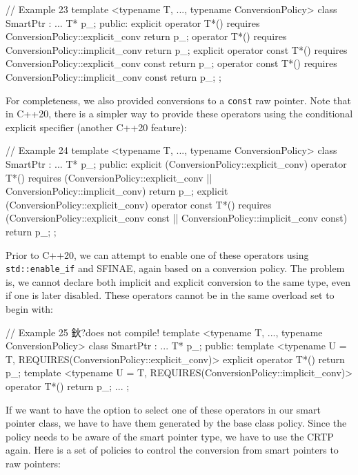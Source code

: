 \begin{code}
// Example 23
template <typename T, ..., typename ConversionPolicy>
class SmartPtr : ... {
  T* p_;
  public:
  explicit operator T*()
    requires ConversionPolicy::explicit_conv
    { return p_; }
  operator T*()
    requires ConversionPolicy::implicit_conv
    { return p_; }
  explicit operator const T*()
    requires ConversionPolicy::explicit_conv const
    { return p_; }
  operator const T*()
    requires ConversionPolicy::implicit_conv const
    { return p_; }
};
\end{code}

For completeness, we also provided conversions to a \texttt{const} raw pointer. Note that in C++20, there is a simpler way to provide these operators using the conditional explicit specifier (another C++20 feature):

\begin{code}
// Example 24
template <typename T, ..., typename ConversionPolicy>
class SmartPtr : ... {
  T* p_;
  public:
  explicit (ConversionPolicy::explicit_conv)
  operator T*()
    requires (ConversionPolicy::explicit_conv ||
              ConversionPolicy::implicit_conv)
    { return p_; }
  explicit (ConversionPolicy::explicit_conv)
  operator const T*()
    requires (ConversionPolicy::explicit_conv const ||
              ConversionPolicy::implicit_conv const)
    { return p_; }
};
\end{code}

Prior to C++20, we can attempt to enable one of these operators using \texttt{std::enable\_if} and SFINAE, again based on a conversion policy. The problem is, we cannot declare both implicit and explicit conversion to the same type, even if one is later disabled. These operators cannot be in the same overload set to begin with:

\begin{code}
// Example 25 鈥?does not compile!
template <typename T, ..., typename ConversionPolicy>
class SmartPtr : ... {
  T* p_;
  public:
  template <typename U = T,
            REQUIRES(ConversionPolicy::explicit_conv)>
  explicit operator T*() { return p_; }
  template <typename U = T,
            REQUIRES(ConversionPolicy::implicit_conv)>
  operator T*() { return p_; }
  ...
};
\end{code}

If we want to have the option to select one of these operators in our smart pointer class, we have to have them generated by the base class policy. Since the policy needs to be aware of the smart pointer type, we have to use the CRTP again. Here is a set of policies to control the conversion from smart pointers to raw pointers:

